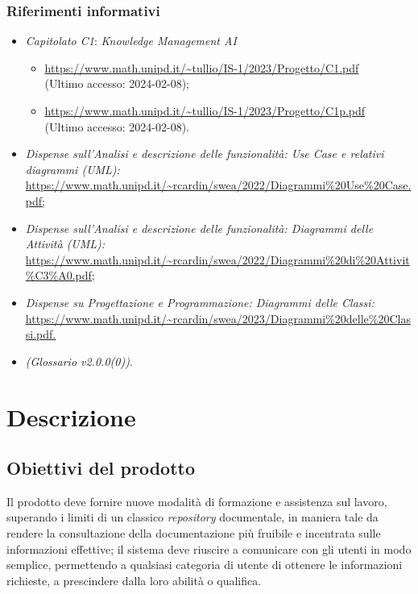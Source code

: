 \documentclass[10pt, a4paper]{article}
\begin{document}
\subsubsection{Riferimenti informativi}
\begin{itemize}
    \item \textit{Capitolato C1}: \textit{Knowledge Management AI}
    \begin{itemize}
        \item \url{https://www.math.unipd.it/~tullio/IS-1/2023/Progetto/C1.pdf}\\
        (Ultimo accesso: 2024-02-08);
        \item \url{https://www.math.unipd.it/~tullio/IS-1/2023/Progetto/C1p.pdf}\\
        (Ultimo accesso: 2024-02-08).
    \end{itemize}
    \item \textit{Dispense sull'Analisi e descrizione delle funzionalità: Use Case e relativi diagrammi (UML):}\\
    \href{https://www.math.unipd.it/~rcardin/swea/2022/Diagrammi%20Use%20Case.pdf}{https://www.math.unipd.it/\textasciitilde rcardin/swea/2022/Diagrammi\%20Use\%20Case.pdf;}
    \item \textit{Dispense sull'Analisi e descrizione delle funzionalità: Diagrammi delle Attività (UML):}\\
    \href{https://www.math.unipd.it/~rcardin/swea/2022/Diagrammi%20di%20Attivit%C3%A0.pdf}{https://www.math.unipd.it/\textasciitilde rcardin/swea/2022/Diagrammi\%20di\%20Attivit\%C3\%A0.pdf;}
    \item \textit{Dispense su Progettazione e Programmazione: Diagrammi delle Classi:}\\
    \href{https://www.math.unipd.it/~rcardin/swea/2023/Diagrammi%20delle%20Classi.pdf}{https://www.math.unipd.it/\textasciitilde rcardin/swea/2023/Diagrammi\%20delle\%20Classi.pdf.}
    \item \textit{(Glossario v2.0.0(0))}.
\end{itemize}

\newpage
\section{Descrizione}
\subsection{Obiettivi del prodotto}
Il prodotto deve fornire nuove modalità di formazione e assistenza sul lavoro, superando i limiti di un classico \textit{repository} documentale, in maniera tale da rendere la consultazione della documentazione più fruibile e incentrata sulle informazioni effettive; il sistema deve riuscire a comunicare con gli utenti in modo semplice, permettendo a qualsiasi categoria di utente di ottenere le informazioni richieste, a prescindere dalla loro abilità o qualifica.
\end{document}
